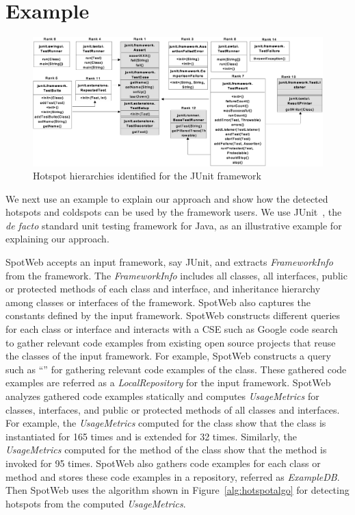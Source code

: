 \section{Example}
\label{sec:example}

\begin{figure}[t]
\centering
\includegraphics[scale=0.68,clip]{figs/examplehotspot_final.eps}
\caption{Hotspot hierarchies identified for the JUnit framework} \label{fig:hotspotexample}
\end{figure}

We next use an example to explain our approach and show how the detected
hotspots and coldspots can be used by the framework users. We use JUnit~\cite{JUNIT}, the
\emph{de facto} standard unit testing framework for Java, 
as an illustrative example for explaining our approach.

SpotWeb accepts an input framework, say JUnit, and extracts
\emph{FrameworkInfo} from the framework. The
\emph{FrameworkInfo} includes all classes, all interfaces, public
or protected methods of each class and interface, and inheritance
hierarchy among classes or interfaces of the framework. SpotWeb also captures
the constants defined by the input framework. SpotWeb
constructs different queries for each class or interface and
interacts with a CSE such as Google code search~\cite{GCSE} to
gather relevant code examples from existing open source projects that
reuse the classes of the input framework. For example, SpotWeb constructs
a query such as ``'' for
gathering relevant code examples of the  class. These
gathered code examples are referred as a \emph{LocalRepository} for
the input framework. SpotWeb analyzes gathered code examples
statically and computes \emph{UsageMetrics} for classes, interfaces,
and public or protected methods of all classes and interfaces. For
example, the \emph{UsageMetrics} computed for the 
class show that the class is instantiated for 165 times and is
extended for 32 times. Similarly, the \emph{UsageMetrics} computed
for the method  of the  class show
that the method is invoked for 95 times. SpotWeb also gathers code
examples for each class or method and stores these code examples in
a repository, referred as \emph{ExampleDB}. Then SpotWeb uses the
algorithm shown in Figure~\ref{alg:hotspotalgo} for detecting
hotspots from the computed \emph{UsageMetrics}.

